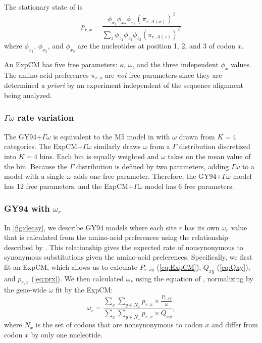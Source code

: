 \documentclass[11pt]{article}
\begin{document}
The stationary state of is 
\begin{equation}
\label{eq:prx}
p_{r,x} = \frac{\phi_{x_1}\phi_{x_2}\phi_{x_3}\left(\pi_{r,A\left(x\right)}\right)^\beta}{\sum_z \phi_{z_1}\phi_{z_2}\phi_{z_3}\left(\pi_{r,A\left(z\right)}\right)^\beta}
\end{equation}
where $\phi_{x_1}$, $\phi_{x_2}$, and $\phi_{x_3}$ are the nucleotides at position 1, 2, and 3 of codon $x$. 

An ExpCM has five free parameters: $\kappa$, $\omega$, and the three independent $\phi_x$ values.
The amino-acid preferences $\pi_{r,a}$ are \emph{not} free parameters since they are determined \textit{a priori} by an experiment independent of the sequence alignment being analyzed.

\subsubsection*{$\Gamma\omega$ rate variation}

The GY94+$\Gamma\omega$ is equivalent to the M5 model in \citet{yang2000codon} with $\omega$ drawn from $K = 4$ categories.
The ExpCM+$\Gamma\omega$ similarly draws $\omega$ from a $\Gamma$ distribution discretized into $K=4$ bins. 
Each bin is equally weighted and $\omega$ takes on the mean value of the bin. 
Because the $\Gamma$ distribution is defined by two parameters, adding $\Gamma\omega$ to a model with a single $\omega$ adds one free parameter.
Therefore, the GY94+$\Gamma\omega$ model has 12 free parameters, and the ExpCM+$\Gamma\omega$ model has 6 free parameters.

\subsubsection*{GY94 with $\omega_r$}
In \ref{fig:decay}, we describe GY94 models where each site $r$ has its own $\omega_r$ value that is calculated from the amino-acid preferences using the relationship described by \citet{spielman2015relationship}.
This relationship gives the expected rate of nonsynonymous to synonymous substitutions given the amino-acid preferences.
Specifically, we first fit an ExpCM, which allows us to calculate $P_{r,xy}$ (\ref{eq:ExpCM}), $Q_{xy}$ (\ref{eq:Qxy}), and $p_{r,x}$ (\ref{eq:prx}).
We then calculated $\omega_r$ using the equation of \citet{spielman2015relationship}, normalizing by the gene-wide $\omega$ fit by the ExpCM:
\begin{equation}
\label{eq:w_r}
\omega_{r} = \frac{\sum_{x} \sum_{y \in N_x} {p_{r,x} \times \frac{P_{r,xy}}{\omega}}}{\sum_{x} \sum_{y \in N_x} {p_{r,x} \times Q_{xy}}},
\end{equation}
where $N_x$ is the set of codons that are nonsynonymous to codon $x$ and differ from codon $x$ by only one nucleotide. 
\end{document}
